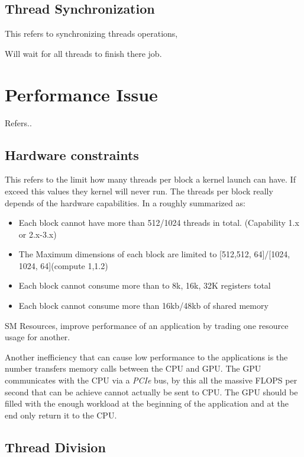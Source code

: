 \subsection{Thread Synchronization}

This refers to synchronizing threads operations,

Will wait for all threads to finish there job.


\section{Performance Issue}

Refers..

\subsection{Hardware constraints}

This refers to the limit how many threads per block a kernel launch can have. If exceed this values they kernel will never run. The threads per block really depends of the hardware capabilities. In a roughly summarized as:

\begin{itemize}
\item Each block cannot have more than 512/1024 threads in total. (Capability 1.x or 2.x-3.x)
\item The Maximum dimensions of each block are limited to [512,512, 64]/[1024, 1024, 64](compute 1,1.2)
\item Each block cannot consume more than to 8k, 16k, 32K registers total
\item Each block cannot consume more than 16kb/48kb of shared memory
\end{itemize}

SM Resources, improve performance of an application by trading one resource usage for another.  \cite{practices}

Another inefficiency that can cause low performance to the applications is the number transfers memory calls between the CPU and GPU. The GPU communicates with the CPU via a \textit{PCIe} bus, by this all the massive FLOPS per second that can be achieve cannot actually be sent to CPU. The GPU should be filled with the enough workload at the beginning of the application and at the end only return it to the CPU.

\subsection{Thread Division}

